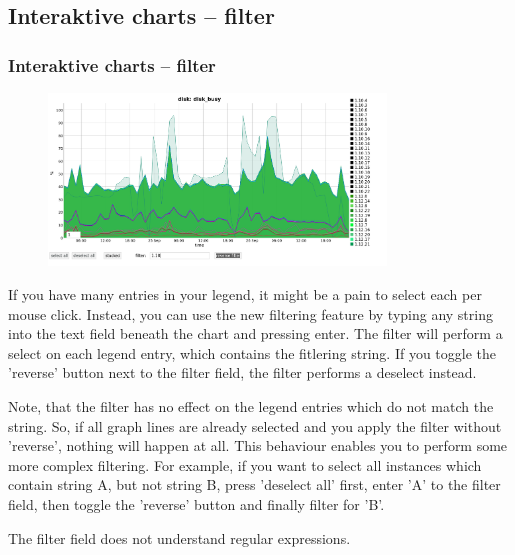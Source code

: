 \documentclass[8pt]{beamer}
\begin{document}
\subsection{Interaktive charts -- filter}
\begin{frame}
\frametitle{Interaktive charts -- filter}
\begin{figure}
	\includegraphics[width=0.8\textwidth, left]{../images/PicDat_filter.png}
\end{figure}

If you have many entries in your legend, it might be a pain to select each per mouse click. Instead, you can use the new filtering feature by typing any string into the text field beneath the chart and pressing enter. The filter will perform a select on each legend entry, which contains the fitlering string. If you toggle the 'reverse' button next to the filter field, the filter performs a deselect instead.

Note, that the filter has no effect on the legend entries which do not match the string. So, if all graph lines are already selected and you apply the filter without 'reverse', nothing will happen at all. This behaviour enables you to perform some more complex filtering. For example, if you want to select all instances which contain string A, but not string B, press 'deselect all' first, enter 'A' to the filter field, then toggle the 'reverse' button and finally filter for 'B'.

The filter field does not understand regular expressions.
\end{frame}
\end{document}
